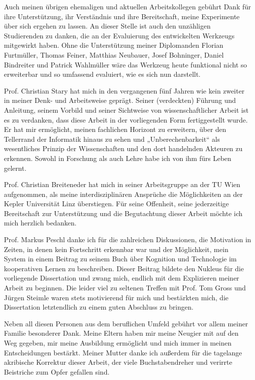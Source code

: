 Auch meinen übrigen ehemaligen und aktuellen Arbeitskollegen gebührt Dank für ihre Unterstützung, ihr Verständnis und ihre Bereitschaft, meine Experimente über sich ergehen zu lassen. An dieser Stelle ist auch den unzähligen Studierenden zu danken, die an der Evaluierung des entwickelten Werkzeugs mitgewirkt haben. Ohne die Unterstützung meiner Diplomanden Florian Furtmüller, Thomas Feiner, Matthias Neubauer, Josef Bohninger, Daniel Bindreiter und Patrick Wahlmüller wäre das Werkzeug heute funktional nicht so erweiterbar und so umfassend evaluiert, wie es sich nun darstellt.

Prof. Christian Stary hat mich in den vergangenen fünf Jahren wie kein zweiter in meiner Denk- und Arbeitsweise geprägt. Seiner (verdeckten) Führung und Anleitung, seinem Vorbild und seiner Sichtweise von wissenschaftlicher Arbeit ist es zu verdanken, dass diese Arbeit in der vorliegenden Form fertiggestellt wurde. Er hat mir ermöglicht, meinen fachlichen Horizont zu erweitern, über den Tellerrand der Informatik hinaus zu sehen und „Unberechenbarkeit“ als wesentliches Prinzip der Wissenschaften und den dort handelnden Akteuren zu erkennen. Sowohl in Forschung als auch Lehre habe ich von ihm fürs Leben gelernt.

Prof. Christian Breiteneder hat mich in seiner Arbeitsgruppe an der TU Wien aufgenommen, als meine interdisziplinären Ansprüche die Möglichkeiten an der Kepler Universität Linz überstiegen. Für seine Offenheit, seine jederzeitige Bereitschaft zur Unterstützung und die Begutachtung dieser Arbeit möchte ich mich herzlich bedanken.

Prof. Markus Peschl danke ich für die zahlreichen Diskussionen, die Motivation in Zeiten, in denen kein Fortschritt erkennbar war und der Möglichkeit, mein System in einem Beitrag zu seinem Buch über Kognition und Technologie im kooperativen Lernen zu beschreiben. Dieser Beitrag bildete den Nukleus für die vorliegende Dissertation und zwang mich, endlich mit dem Explizieren meiner Arbeit zu beginnen. Die leider viel zu seltenen Treffen mit Prof. Tom Gross und Jürgen Steimle waren stets motivierend für mich und bestärkten mich, die Dissertation letztendlich zu einem guten Abschluss zu bringen.

Neben all diesen Personen aus dem beruflichen Umfeld gebührt vor allem meiner Familie besonderer Dank. Meine Eltern haben mir meine Neugier mit auf den Weg gegeben, mir meine Ausbildung ermöglicht und mich immer in meinen Entscheidungen bestärkt. Meiner Mutter danke ich außerdem für die tagelange akribische Korrektur dieser Arbeit, der viele Buchstabendreher und verirrte Beistriche zum Opfer gefallen sind.

